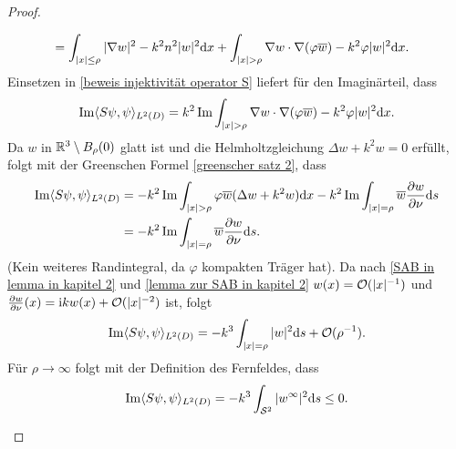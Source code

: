 \begin{proof}
\begin{enumerate}[label=(\alph*)]
\begin{align*}
			&=\int_{|x|\leq\rho}|\nabla w|^2-k^2n^2|w|^2\dx
			 +\int_{|x|>\rho}\nabla w\cdot\nabla(\varphi\overline{w})-k^2\varphi|w|^2\dx.
		\end{align*}
		Einsetzen in \eqref{beweis injektivität operator S} liefert für den Imaginärteil, dass 
		\begin{equation*}
			\IM\scalLtwoD{S\psi}{\psi}=k^2\IM\int_{|x|>\rho}\nabla w\cdot\nabla(\varphi\overline{w}) - k^2\varphi|w|^2\dx.
		\end{equation*}
		Da \(w\) in \(\mathbb{R}^3\setminus B_\rho(0)\) glatt ist und die Helmholtzgleichung \(\Delta w+k^2w=0\) erfüllt, folgt mit der Greenschen Formel \eqref{greenscher satz 2}, dass
		\begin{align*}
			\IM\scalLtwoD{S\psi}{\psi}
			&=-k^2\IM\int_{|x|>\rho}\varphi\overline{w}(\Delta w+k^2w)\dx 
			- k^2\IM\int_{|x|=\rho}\overline{w}\frac{\p w}{\p\normal}\ds\\
			&=-k^2\IM\int_{|x|=\rho}\overline{w}\frac{\p w}{\p\normal}\ds.
		\end{align*}
		(Kein weiteres Randintegral, da \(\varphi\) kompakten Träger hat). Da nach \eqref{SAB in lemma in kapitel 2} und \eqref{lemma zur SAB in kapitel 2} \(w(x)=\mathcal{O}(|x|^{-1})\) und \(\frac{\partial w}{\partial\nu}(x)=\mathrm{i} kw(x)+\mathcal{O}(|x|^{-2})\) ist, folgt
		\begin{equation*}
			\operatorname{Im}\langle S\psi,\psi\rangle_{L^2(D)}=-k^3\int_{|x|=\rho}|w|^2\mathrm{d}s+\mathcal{O}(\rho^{-1}).
		\end{equation*}
		Für \(\rho\to\infty\) folgt mit der Definition des Fernfeldes, dass
		\begin{equation*}
			\operatorname{Im}\langle S\psi,\psi\rangle_{L^2(D)}=-k^3\int_{\mathcal{S}^2}|w^\infty|^2\mathrm{d}s\leq0.
		\end{equation*}
	

\end{enumerate}
\end{proof}

